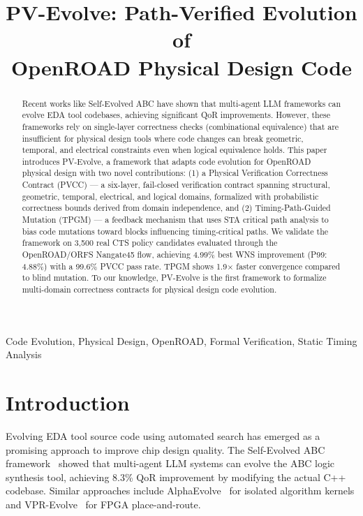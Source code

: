 \documentclass[conference]{IEEEtran}
\title{PV-Evolve: Path-Verified Evolution of\\OpenROAD Physical Design Code}
\author{
\IEEEauthorblockN{Vedant Sinha}
\IEEEauthorblockA{Indian Institute of Technology\\
vedantsinha05@gmail.com}
}
\begin{document}
\maketitle

\begin{abstract}
Recent works like Self-Evolved ABC have shown that multi-agent LLM frameworks can evolve EDA tool codebases, achieving significant QoR improvements. However, these frameworks rely on single-layer correctness checks (combinational equivalence) that are insufficient for physical design tools where code changes can break geometric, temporal, and electrical constraints even when logical equivalence holds. This paper introduces PV-Evolve, a framework that adapts code evolution for OpenROAD physical design with two novel contributions: (1) a Physical Verification Correctness Contract (PVCC) --- a six-layer, fail-closed verification contract spanning structural, geometric, temporal, electrical, and logical domains, formalized with probabilistic correctness bounds derived from domain independence, and (2) Timing-Path-Guided Mutation (TPGM) --- a feedback mechanism that uses STA critical path analysis to bias code mutations toward blocks influencing timing-critical paths. We validate the framework on 3,500 real CTS policy candidates evaluated through the OpenROAD/ORFS Nangate45 flow, achieving 4.99\% best WNS improvement (P99: 4.88\%) with a 99.6\% PVCC pass rate. TPGM shows 1.9$\times$ faster convergence compared to blind mutation. To our knowledge, PV-Evolve is the first framework to formalize multi-domain correctness contracts for physical design code evolution.
\end{abstract}

\begin{IEEEkeywords}
Code Evolution, Physical Design, OpenROAD, Formal Verification, Static Timing Analysis
\end{IEEEkeywords}

\section{Introduction}

Evolving EDA tool source code using automated search has emerged as a promising approach to improve chip design quality. The Self-Evolved ABC framework~\cite{self-evolved-abc} showed that multi-agent LLM systems can evolve the ABC logic synthesis tool, achieving 8.3\% QoR improvement by modifying the actual C++ codebase. Similar approaches include AlphaEvolve~\cite{alphaevolve} for isolated algorithm kernels and VPR-Evolve~\cite{vpr-evolve} for FPGA place-and-route.
\end{document}
